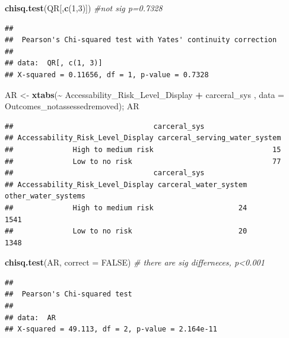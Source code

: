 \documentclass[
]{article}
\newenvironment{Shaded}{\begin{snugshade}}{\end{snugshade}}
\newcommand{\AttributeTok}[1]{\textcolor[rgb]{0.13,0.29,0.53}{#1}}
\newcommand{\CommentTok}[1]{\textcolor[rgb]{0.56,0.35,0.01}{\textit{#1}}}
\newcommand{\ConstantTok}[1]{\textcolor[rgb]{0.56,0.35,0.01}{#1}}
\newcommand{\DecValTok}[1]{\textcolor[rgb]{0.00,0.00,0.81}{#1}}
\newcommand{\FunctionTok}[1]{\textcolor[rgb]{0.13,0.29,0.53}{\textbf{#1}}}
\newcommand{\NormalTok}[1]{#1}
\newcommand{\OtherTok}[1]{\textcolor[rgb]{0.56,0.35,0.01}{#1}}
\newcommand{\SpecialCharTok}[1]{\textcolor[rgb]{0.81,0.36,0.00}{\textbf{#1}}}
\begin{document}
\begin{Shaded}
\begin{Highlighting}[]
\FunctionTok{chisq.test}\NormalTok{(QR[,}\FunctionTok{c}\NormalTok{(}\DecValTok{1}\NormalTok{,}\DecValTok{3}\NormalTok{)]) }\CommentTok{\#not sig p=0.7328}
\end{Highlighting}
\end{Shaded}

\begin{verbatim}
## 
##  Pearson's Chi-squared test with Yates' continuity correction
## 
## data:  QR[, c(1, 3)]
## X-squared = 0.11656, df = 1, p-value = 0.7328
\end{verbatim}

\begin{Shaded}
\begin{Highlighting}[]
\NormalTok{AR }\OtherTok{\textless{}{-}} \FunctionTok{xtabs}\NormalTok{(}\SpecialCharTok{\textasciitilde{}}\NormalTok{ Accessability\_Risk\_Level\_Display }\SpecialCharTok{+}\NormalTok{ carceral\_sys , }\AttributeTok{data =}\NormalTok{ Outcomes\_notassessedremoved); AR}
\end{Highlighting}
\end{Shaded}

\begin{verbatim}
##                                 carceral_sys
## Accessability_Risk_Level_Display carceral_serving_water_system
##              High to medium risk                            15
##              Low to no risk                                 77
##                                 carceral_sys
## Accessability_Risk_Level_Display carceral_water_system other_water_systems
##              High to medium risk                    24                1541
##              Low to no risk                         20                1348
\end{verbatim}

\begin{Shaded}
\begin{Highlighting}[]
\FunctionTok{chisq.test}\NormalTok{(AR, }\AttributeTok{correct =} \ConstantTok{FALSE}\NormalTok{) }\CommentTok{\# there are sig differneces, p\textless{}0.001}
\end{Highlighting}
\end{Shaded}

\begin{verbatim}
## 
##  Pearson's Chi-squared test
## 
## data:  AR
## X-squared = 49.113, df = 2, p-value = 2.164e-11
\end{verbatim}
\end{document}
